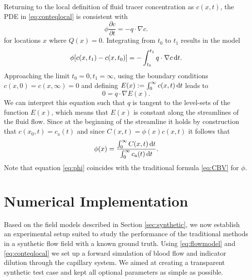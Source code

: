\documentclass[journal,twocolumn]{IEEEtran}
\newcommand{\ca}{c_\mathrm{a}}
\begin{document}
	Returning to the local definition of fluid tracer concentration as $c(x,t)$, the PDE in \eqref{eq:conteqlocal} is consistent with
	\begin{equation}
		\phi\frac{\partial c}{\partial t}  = - q \cdot \nabla c.
		\label{eq:1cmodel}
	\end{equation}
	for locations $x$ where $Q(x) = 0$.
	Integrating from $t_0$ to $t_1$ results in the model
	\begin{equation}
		\phi [c(x,t_1) - c(x,t_0)]  = - \int_{t_0}^{t_1}q \cdot  \nabla c \,\mathrm{d} t.
	\end{equation}
	Approaching the limit $t_0 = 0, t_1 = \infty$, using the boundary conditions $c(x,0) = c(x,\infty) = 0$ and defining $E(x):= \int_0^\infty c(x,t) \,\mathrm{d} t$ leads to
	\begin{equation}
		0 = q \cdot \nabla  E(x).
		\label{eq:streamlinezero}
	\end{equation}
	We can interpret this equation such that $q$ is tangent to the level-sets of the function $E(x)$, which means that $E(x)$ is constant along the streamlines of the fluid flow.
	Since at the beginning of the streamline it holds by construction that $c(x_0,t) = \ca(t)$ and since $C(x,t) = \phi(x) c(x,t)$ it follows that 	
	\begin{equation}
		\phi(x) =  \frac{ \int_{0}^{\infty} C(x,t) \diffint t }{\int_{0}^{\infty} \ca(t) \diffint t}.
		\label{eq:phi}
	\end{equation}
	Note that equation \eqref{eq:phi} coincides with the traditional formula \eqref{eq:CBV} for $\phi$.
	
	
	\section{Numerical Implementation}\label{sec:NumExp}
	Based on the field models described in Section \ref{sec:synthetic}, we now establish an experimental setup suited to study the performance of the traditional methods in a synthetic flow field 		with a known ground truth. Using \eqref{eq:flowmodel} and \eqref{eq:conteqlocal} we set up a forward simulation of blood flow and indicator dilution through the capillary system. We aimed at creating a transparent synthetic test case and kept all optional parameters as simple as possible. 
	
\end{document}
